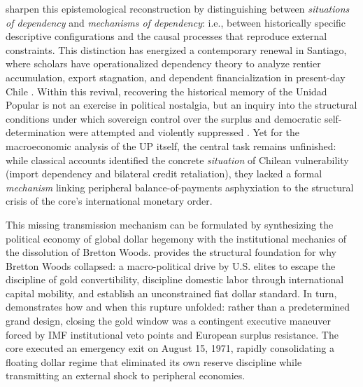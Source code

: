 \citet{MadariagaPalestini2021} sharpen this epistemological reconstruction by distinguishing 
between \textit{situations of dependency} and \textit{mechanisms of dependency}: i.e., between historically specific  descriptive configurations and the causal processes that reproduce external constraints. This 
distinction has energized a contemporary renewal in Santiago, where scholars have operationalized dependency 
theory to analyze rentier accumulation, export stagnation, and dependent financialization in present-day Chile 
\citep{Ahumada2019,Ruiz2021,AhumadaTorres2024,Sossdorf2024}. Within this revival, recovering the historical memory  of the Unidad Popular is not an exercise in political nostalgia, but an inquiry into the structural conditions 
under which sovereign control over the surplus and democratic self-determination were attempted and violently 
suppressed \citep{Arboleda2023,AhumadaChang2025}. Yet for the macroeconomic analysis of the UP itself, the 
central task remains unfinished: while classical accounts identified the concrete \textit{situation} of Chilean 
vulnerability (import dependency and bilateral credit retaliation), they lacked a formal \textit{mechanism} 
linking peripheral balance-of-payments asphyxiation to the structural crisis of the core's international monetary order.

This missing transmission mechanism can be formulated by synthesizing the political economy 
of global dollar hegemony with the institutional mechanics of the dissolution of Bretton 
Woods. \citet{Vernengo2021} provides the structural foundation for why Bretton Woods collapsed: a macro-political drive by U.S. elites to escape the discipline of gold convertibility, discipline domestic labor through international capital mobility, and establish an unconstrained fiat dollar standard. In turn, \citet{Zoeller2019} demonstrates how and when this rupture unfolded: rather than a predetermined grand design, closing the gold window was a contingent executive maneuver forced by IMF institutional veto points and European surplus resistance. The core executed an emergency exit on August 15, 1971, rapidly consolidating a floating dollar regime that eliminated its own reserve discipline while transmitting an external shock to peripheral economies.

